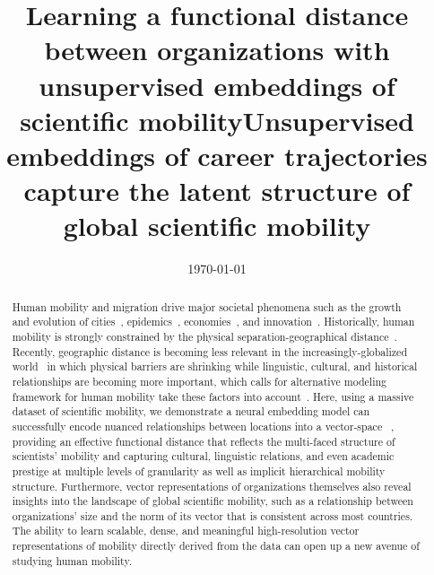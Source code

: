 \documentclass[12pt]{article} %
\begin{document}
\title{Learning a functional distance between organizations with unsupervised embeddings of scientific mobility}
\title{Unsupervised embeddings of career trajectories capture the latent structure of global scientific mobility} %
\date{\today}
\maketitle %

%
%

\begin{abstract}


Human mobility and migration drive major societal phenomena such as the growth and evolution of cities~\autocite{wef2017migration, curiel2018citygravity},  epidemics~\autocite{kraemer2020covid, truscott2012epidemicgravity, xia2005measlesgravity}, economies~\autocite{kaluza2010cargo, kerr2011immigration}, and innovation~\autocite{kaiser2018innovation, armano2017innovation, sugimoto2017mostimpact, petersen2018multiscale, franzoni2014advantage}.
Historically, human mobility is strongly constrained by the physical separation-geographical distance~\autocite{zipf1946gravity}.
Recently, geographic distance is becoming less relevant in the increasingly-globalized world~\autocite{czaika2018migration, czaika2018globalisation, buchan2009globalization, altbach2004globalization} in which physical barriers are shrinking while linguistic, cultural, and historical relationships are becoming more important, which calls for alternative modeling framework for human mobility take these factors into account~\autocite{boschma2005proximity,  brown1970functional, brown1970migration, kim2018functional}.
Here, using a massive dataset of scientific mobility, we demonstrate a neural embedding model can successfully encode nuanced relationships between locations into a vector-space ~\autocite{mikolov2013word2vec}, providing an effective functional distance that reflects the multi-faced structure of scientists' mobility and capturing cultural, linguistic relations, and even academic prestige at multiple levels of granularity as well as implicit hierarchical mobility structure.
Furthermore, vector representations of organizations themselves also reveal insights into the landscape of global scientific mobility, such as a relationship between organizations' size and the norm of its vector that is consistent across most countries. 
The ability to learn scalable, dense, and meaningful high-resolution vector representations of mobility directly derived from the data can open up a new avenue of studying human mobility.


\end{abstract}
\end{document}
